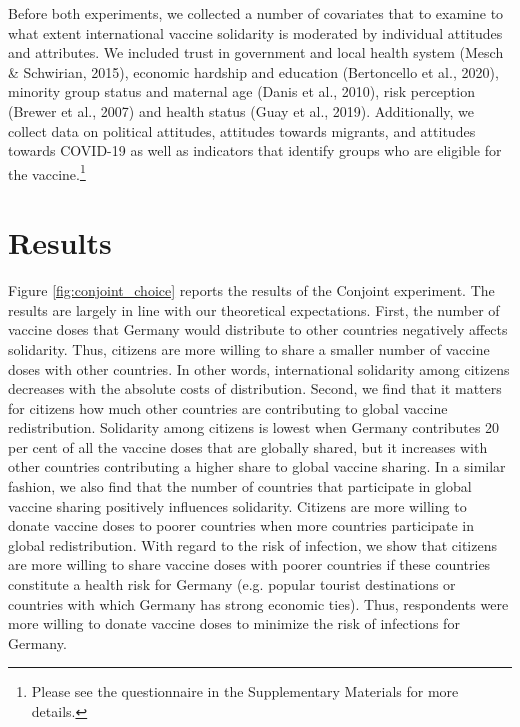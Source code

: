 \documentclass[12pt,oneside,smallheadings,chapterprefix=true]{article}
\begin{document}
Before both experiments, we collected a number of covariates that to examine to what extent international vaccine solidarity is moderated by individual attitudes and attributes. We included trust in government and local health system (Mesch
\& Schwirian, 2015), economic hardship and education (Bertoncello et al.,
2020), minority group status and maternal age (Danis et al., 2010), risk
perception (Brewer et al., 2007) and health status (Guay et al., 2019).
Additionally, we collect data on political attitudes, attitudes towards
migrants, and attitudes towards COVID-19 as well as indicators that
identify groups who are eligible for the vaccine.\footnote{Please see the
questionnaire in the Supplementary Materials for more details.}



\section*{Results}
\label{sec:results}

Figure \ref{fig:conjoint_choice} reports the results of the Conjoint experiment. The results are largely in line with our theoretical expectations. First, the number of vaccine doses that Germany would distribute to other countries negatively affects solidarity. Thus, citizens are more willing to share a smaller number of vaccine doses with other countries. In other words, international solidarity among citizens decreases with the absolute costs of distribution. Second, we find that it matters for citizens how much other countries are contributing to global vaccine redistribution. Solidarity among citizens is lowest when Germany contributes 20 per cent of all the vaccine doses that are globally shared, but it increases with other countries contributing a higher share to global vaccine sharing. In a similar fashion, we also find that the number of countries that participate in global vaccine sharing positively influences solidarity. Citizens are more willing to donate vaccine doses to poorer countries when more countries participate in global redistribution. With regard to the risk of infection, we show that citizens are more willing to share vaccine doses with poorer countries if these countries constitute a health risk for Germany (e.g. popular tourist destinations or countries with which Germany has strong economic ties). Thus, respondents were more willing to donate vaccine doses to minimize the risk of infections for Germany. 
\end{document}
